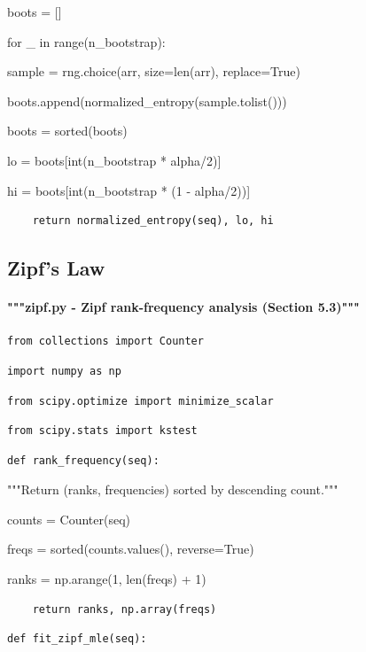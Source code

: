 \documentclass[11pt,letterpaper]{article}
\begin{document}
    boots = []


    for \_ in range(n\_bootstrap):


        sample = rng.choice(arr, size=len(arr), replace=True)


        boots.append(normalized\_entropy(sample.tolist()))


    boots = sorted(boots)


    lo = boots[int(n\_bootstrap * alpha/2)]


    hi = boots[int(n\_bootstrap * (1 - alpha/2))]

\begin{lstlisting}
    return normalized_entropy(seq), lo, hi
\end{lstlisting}

\subsection{Zipf's Law}

\paragraph{"""zipf.py - Zipf rank-frequency analysis (Section 5.3)"""}

\begin{lstlisting}
from collections import Counter
\end{lstlisting}
\begin{lstlisting}
import numpy as np
\end{lstlisting}
\begin{lstlisting}
from scipy.optimize import minimize_scalar
\end{lstlisting}
\begin{lstlisting}
from scipy.stats import kstest
\end{lstlisting}
\begin{lstlisting}
def rank_frequency(seq):
\end{lstlisting}

    """Return (ranks, frequencies) sorted by descending count."""


    counts = Counter(seq)


    freqs = sorted(counts.values(), reverse=True)


    ranks = np.arange(1, len(freqs) + 1)

\begin{lstlisting}
    return ranks, np.array(freqs)
\end{lstlisting}
\begin{lstlisting}
def fit_zipf_mle(seq):
\end{lstlisting}
\end{document}
